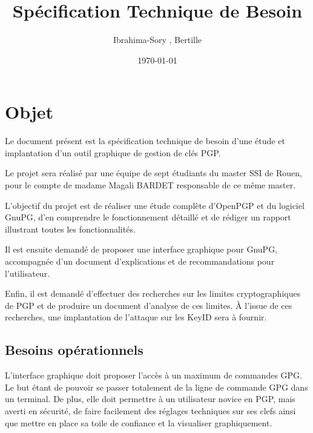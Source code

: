 \documentclass{../res/univ-projet}
\title{Spécification Technique de Besoin}
\author{Ibrahima-Sory \bsc{Barry}, Bertille \bsc{Bouillie}}
\date{\today}
\begin{document}
\maketitle
\newpage
\tableofcontents
\newpage

\section{Objet}

Le document présent est la spécification technique de besoin d'une étude et implantation d'un outil graphique de gestion de clés PGP.

Le projet sera réalisé par une équipe de sept étudiants du master SSI de Rouen, pour le compte de madame Magali BARDET responsable de ce même master. 

L'objectif du projet est de réaliser une étude complète d'OpenPGP et du logiciel GnuPG, d'en comprendre le fonctionnement détaillé et de rédiger un rapport illustrant toutes les fonctionnalités.

Il est ensuite demandé de proposer une interface graphique pour GnuPG, accompagnée d'un document d'explications et de recommandations pour l'utilisateur.


Enfin, il est demandé d'effectuer des recherches sur les limites cryptographiques de PGP et de produire un document d'analyse de ces limites. \`{A} l'issue de ces recherches, une implantation de l'attaque sur les KeyID sera à fournir.

\subsection{Besoins opérationnels}
L'interface graphique doit proposer l'accès à un maximum de commandes GPG. Le but étant de pouvoir se passer totalement de la ligne de commande GPG dans un terminal. De plus, elle doit permettre à un utilisateur novice en PGP, mais averti en sécurité, de faire facilement des réglages techniques sur ses clefs ainsi que mettre en place sa toile de confiance et la visualiser graphiquement.
\end{document}
